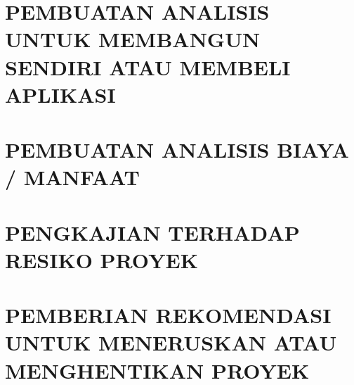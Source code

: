 \documentclass[pdftex, 12pt, oneside]{article}
\begin{document}
\section{PEMBUATAN ANALISIS UNTUK MEMBANGUN SENDIRI ATAU MEMBELI APLIKASI}


\section{PEMBUATAN ANALISIS BIAYA / MANFAAT}


\section{PENGKAJIAN TERHADAP RESIKO PROYEK}


\section{PEMBERIAN REKOMENDASI UNTUK MENERUSKAN ATAU MENGHENTIKAN PROYEK}
\end{document}
